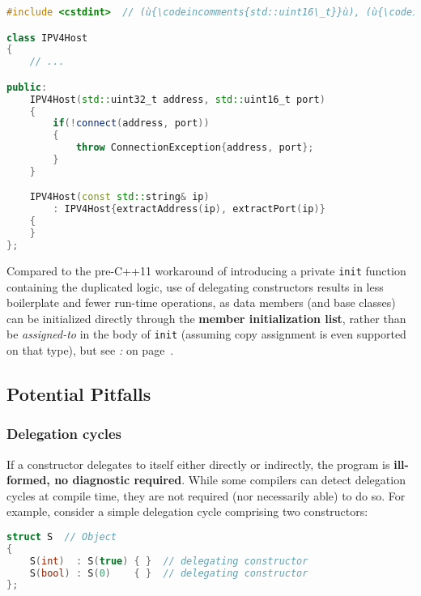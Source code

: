 \begin{lstlisting}[language=C++]
#include <cstdint>  // (ù{\codeincomments{std::uint16\_t}}ù), (ù{\codeincomments{std::uint32\_t}}ù)

class IPV4Host
{
    // ...

public:
    IPV4Host(std::uint32_t address, std::uint16_t port)
    {
        if(!connect(address, port))
        {
            throw ConnectionException{address, port};
        }
    }

    IPV4Host(const std::string& ip)
        : IPV4Host{extractAddress(ip), extractPort(ip)}
    {
    }
};
\end{lstlisting}

\noindent Compared to the pre-C++11 workaround of introducing a private
\texttt{init} function containing the duplicated logic, use of
delegating constructors results in less boilerplate and fewer run-time
operations, as data members (and base classes) can be initialized
directly through the \textbf{member initialization list}, rather than be
\emph{assigned-to} in the body of \texttt{init} (assuming copy
assignment is even supported on that type), but see
{\it{}:} {\it{}} on page~\pageref{suboptimal-factoring}.

\subsection[Potential Pitfalls]{Potential Pitfalls}\label{ctordelegrating-potential-pitfalls}

\subsubsection[Delegation cycles]{Delegation cycles}\label{delegation-cycles}

If a constructor delegates to itself either directly or indirectly, the
program is \textbf{ill-formed, no diagnostic required}. While some
compilers can detect delegation cycles at compile time, they are not
required (nor necessarily able) to do so. For example, consider a simple
delegation cycle comprising two constructors:

\begin{lstlisting}[language=C++]
struct S  // Object
{
    S(int)  : S(true) { }  // delegating constructor
    S(bool) : S(0)    { }  // delegating constructor
};
\end{lstlisting}

